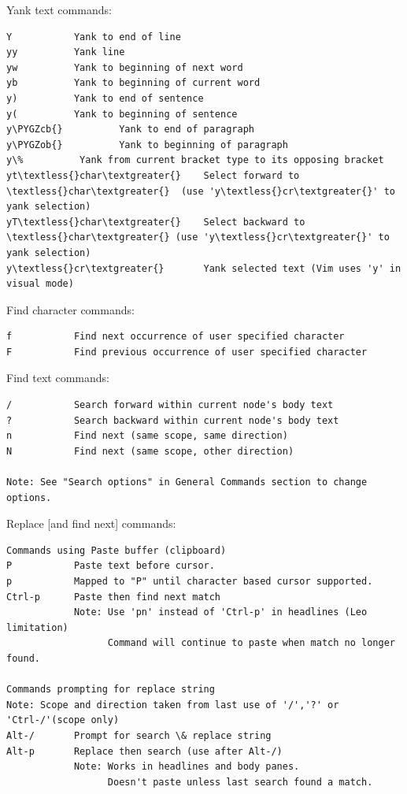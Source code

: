 \documentclass[a4paper,10pt,english]{sphinxmanual}
\def\PYGZob{\char`\{}
\def\PYGZcb{\char`\}}
\begin{document}
Yank text commands:

\begin{Verbatim}[commandchars=\\\{\}]
Y           Yank to end of line
yy          Yank line
yw          Yank to beginning of next word
yb          Yank to beginning of current word
y)          Yank to end of sentence
y(          Yank to beginning of sentence
y\PYGZcb{}          Yank to end of paragraph
y\PYGZob{}          Yank to beginning of paragraph
y\%          Yank from current bracket type to its opposing bracket
yt\textless{}char\textgreater{}    Select forward to \textless{}char\textgreater{}  (use 'y\textless{}cr\textgreater{}' to yank selection)
yT\textless{}char\textgreater{}    Select backward to \textless{}char\textgreater{} (use 'y\textless{}cr\textgreater{}' to yank selection)
y\textless{}cr\textgreater{}       Yank selected text (Vim uses 'y' in visual mode)
\end{Verbatim}

Find character commands:

\begin{Verbatim}[commandchars=\\\{\}]
f           Find next occurrence of user specified character
F           Find previous occurrence of user specified character
\end{Verbatim}

Find text commands:

\begin{Verbatim}[commandchars=\\\{\}]
/           Search forward within current node's body text
?           Search backward within current node's body text
n           Find next (same scope, same direction)
N           Find next (same scope, other direction)

Note: See "Search options" in General Commands section to change options.
\end{Verbatim}

Replace {[}and find next{]} commands:

\begin{Verbatim}[commandchars=\\\{\}]
Commands using Paste buffer (clipboard)
P           Paste text before cursor.
p           Mapped to "P" until character based cursor supported.
Ctrl-p      Paste then find next match
            Note: Use 'pn' instead of 'Ctrl-p' in headlines (Leo limitation)
                  Command will continue to paste when match no longer found.

Commands prompting for replace string
Note: Scope and direction taken from last use of '/','?' or 'Ctrl-/'(scope only)
Alt-/       Prompt for search \& replace string
Alt-p       Replace then search (use after Alt-/)
            Note: Works in headlines and body panes.
                  Doesn't paste unless last search found a match.
\end{Verbatim}
\end{document}
